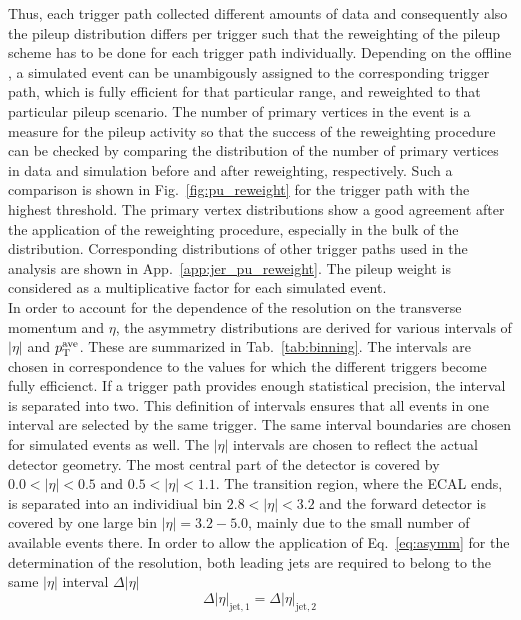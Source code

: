 Thus, each trigger path collected different amounts of data and consequently also the pileup distribution differs per trigger such that the reweighting of the pileup scheme has to be done for each trigger path individually. Depending on the offline \ptave, a simulated event can be unambigously assigned to the corresponding trigger path, which is fully efficient for that particular \pt range, and reweighted to that particular pileup scenario. The number of primary vertices in the event is a measure for the pileup activity so that the success of the reweighting procedure can be checked by comparing the distribution of the number of primary vertices in data and simulation before and after reweighting, respectively. Such a comparison is shown in Fig.~\ref{fig:pu_reweight} for the trigger path with the highest \ptave threshold. The primary vertex distributions show a good agreement after the application of the reweighting procedure, especially in the bulk of the distribution. Corresponding distributions of other trigger paths used in the analysis are shown in App.~\ref{app:jer_pu_reweight}. The pileup weight is considered as a multiplicative factor for each simulated event. \\
In order to account for the dependence of the resolution on the transverse momentum and $\eta$, the asymmetry distributions are derived for various intervals of $|\eta|$ and $p_{\text{T}}^\mathrm{ave}$. These are summarized in Tab.~\ref{tab:binning}. The \ptave intervals are chosen in correspondence to the \ptave values for which the different triggers become fully efficienct. If a trigger path provides enough statistical precision, the interval is separated into two. This definition of \ptave intervals ensures that all events in one \ptave interval are selected by the same trigger. The same interval boundaries are chosen for simulated events as well. The $|\eta|$ intervals are chosen to reflect the actual detector geometry. The most central part of the detector is covered by $ 0.0 < |\eta| < 0.5$ and $0.5 < |\eta| < 1.1$. The transition region, where the ECAL ends, is separated into an individiual bin $ 2.8 < |\eta| < 3.2$ and the forward detector is covered by one large bin $|\eta| = 3.2 - 5.0$, mainly due to the small number of available events there. In order to allow the application of Eq.~\ref{eq:asymm} for the determination of the resolution, both leading jets are required to belong to the same $|\eta|$ interval $\Delta |\eta|$
\begin{equation}
 \Delta |\eta|_{\mathrm{jet},1} = \Delta |\eta|_{\mathrm{jet},2}
\end{equation}
